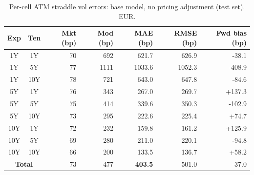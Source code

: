 \begin{table}[H]
\centering
\caption{Per-cell ATM straddle vol errors: base model, no pricing adjustment (test set). EUR.}
\label{tab:base_per_cell_test}
\small
\begin{tabular}{@{}ccrrrrr@{}}
\toprule
\textbf{Exp} & \textbf{Ten} & \textbf{Mkt (bp)} & \textbf{Mod (bp)} & \textbf{MAE (bp)} & \textbf{RMSE (bp)} & \textbf{Fwd bias (bp)} \\
\midrule
  1Y & 1Y & 70 & 692 & 621.7 & 626.9 & -38.1 \\
  1Y & 5Y & 77 & 1111 & 1033.6 & 1052.3 & -408.9 \\
  1Y & 10Y & 78 & 721 & 643.0 & 647.8 & -84.6 \\
  \midrule
  5Y & 1Y & 76 & 343 & 267.0 & 269.7 & +137.3 \\
  5Y & 5Y & 75 & 414 & 339.6 & 350.3 & -102.9 \\
  5Y & 10Y & 73 & 295 & 222.6 & 225.4 & +74.7 \\
  \midrule
  10Y & 1Y & 72 & 232 & 159.8 & 161.2 & +125.9 \\
  10Y & 5Y & 69 & 280 & 211.0 & 220.1 & -94.8 \\
  10Y & 10Y & 66 & 200 & 133.5 & 136.7 & +58.2 \\
\midrule
  \multicolumn{2}{c}{\textbf{Total}} & 73 & 477 & \textbf{403.5} & 501.0 & -37.0 \\
\bottomrule
\end{tabular}
\end{table}